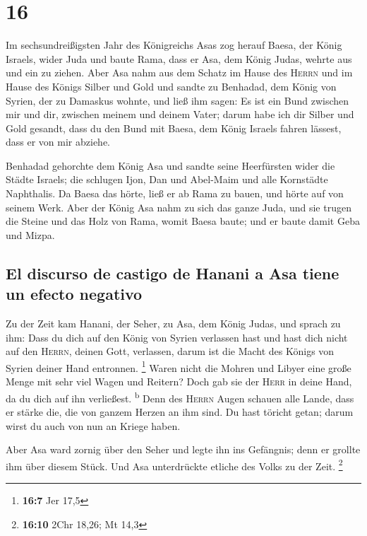 \hypertarget{section-15}{%
\section{16}\label{section-15}}

 Im sechsundreißigsten Jahr des Königreichs Asas zog
herauf Baesa, der König Israels, wider Juda und baute Rama, dass er Asa,
dem König Judas, wehrte aus und ein zu ziehen.  Aber Asa
nahm aus dem Schatz im Hause des \textsc{Herrn} und im Hause des Königs
Silber und Gold und sandte zu Benhadad, dem König von Syrien, der zu
Damaskus wohnte, und ließ ihm sagen:  Es ist ein Bund
zwischen mir und dir, zwischen meinem und deinem Vater; darum habe ich
dir Silber und Gold gesandt, dass du den Bund mit Baesa, dem König
Israels fahren lässest, dass er von mir abziehe.

 Benhadad gehorchte dem König Asa und sandte seine
Heerfürsten wider die Städte Israels; die schlugen Ijon, Dan und
Abel-Maim und alle Kornstädte Naphthalis.  Da Baesa das
hörte, ließ er ab Rama zu bauen, und hörte auf von seinem Werk.
 Aber der König Asa nahm zu sich das ganze Juda, und sie
trugen die Steine und das Holz von Rama, womit Baesa baute; und er baute
damit Geba und Mizpa.

\hypertarget{el-discurso-de-castigo-de-hanani-a-asa-tiene-un-efecto-negativo}{%
\subsection{El discurso de castigo de Hanani a Asa tiene un efecto
negativo}\label{el-discurso-de-castigo-de-hanani-a-asa-tiene-un-efecto-negativo}}

 Zu der Zeit kam Hanani, der Seher, zu Asa, dem König
Judas, und sprach zu ihm: Dass du dich auf den König von Syrien
verlassen hast und hast dich nicht auf den \textsc{Herrn}, deinen Gott,
verlassen, darum ist die Macht des Königs von Syrien deiner Hand
entronnen. \footnote{\textbf{16:7} Jer 17,5}  Waren nicht
die Mohren und Libyer eine große Menge mit sehr viel Wagen und Reitern?
Doch gab sie der \textsc{Herr} in deine Hand, da du dich auf ihn
verließest. \textsuperscript{b}  Denn des \textsc{Herrn}
Augen schauen alle Lande, dass er stärke die, die von ganzem Herzen an
ihm sind. Du hast töricht getan; darum wirst du auch von nun an Kriege
haben.

 Aber Asa ward zornig über den Seher und legte ihn ins
Gefängnis; denn er grollte ihm über diesem Stück. Und Asa unterdrückte
etliche des Volks zu der Zeit. \footnote{\textbf{16:10} 2Chr 18,26; Mt
  14,3}

